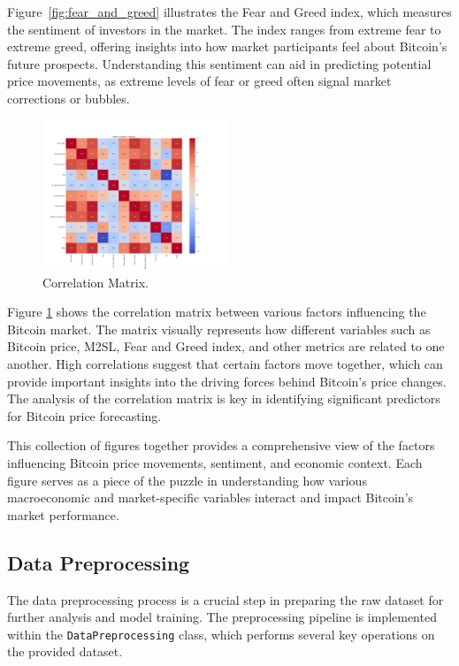 Figure\ \ref{fig:fear_and_greed} illustrates the Fear and Greed index, which measures the sentiment of investors in
the market. The index ranges from extreme fear to extreme greed, offering insights into how market participants feel
about Bitcoin's future prospects. Understanding this sentiment can aid in predicting potential price movements, as
extreme levels of fear or greed often signal market corrections or bubbles.


\begin{figure}[h]
    \centering
    \includegraphics[width=0.5\textwidth]{plots/correlation_matrix_plot.png} %
    \caption{Correlation Matrix.}
    \label{fig:correlation_matrix}
\end{figure}

Figure \ref{fig:correlation_matrix} shows the correlation matrix between various factors influencing the Bitcoin market.
The matrix visually represents how different variables such as Bitcoin price, M2SL, Fear and Greed index, and other
metrics are related to one another. High correlations suggest that certain factors move together, which can provide
important insights into the driving forces behind Bitcoin's price changes. The analysis of the correlation matrix is
key in identifying significant predictors for Bitcoin price forecasting.

This collection of figures together provides a comprehensive view of the factors influencing Bitcoin price movements,
sentiment, and economic context. Each figure serves as a piece of the puzzle in understanding how various macroeconomic
and market-specific variables interact and impact Bitcoin’s market performance.

\subsection{Data Preprocessing}\label{sec:data_preprocessing}

The data preprocessing process is a crucial step in preparing the raw dataset for further analysis and model training.
The preprocessing pipeline is implemented within the \texttt{DataPreprocessing} class, which performs several key
operations on the provided dataset.

